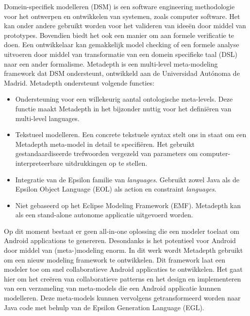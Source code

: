 Domein-specifiek modelleren (DSM) is een software engineering methodologie voor het ontwerpen en ontwikkelen van systemen, zoals computer software. Het kan onder andere gebruikt worden voor het valideren van idee\"en door middel van prototypes. Bovendien biedt het ook een manier om aan formele verificatie te doen. Een ontwikkelaar kan gemakkelijk model checking of een formele analyse uitvoeren door middel van transformatie van een domein specifieke taal (DSL) naar een ander formalisme. Metadepth is een multi-level meta-modeling framework dat DSM ondersteunt, ontwikkeld aan de Universidad Aut\'onoma de Madrid. Metadepth ondersteunt volgende functies:
\begin{itemize}
\item{Ondersteuning voor een willekeurig aantal ontologische meta-levels. Deze functie maakt Metadepth in het bijzonder nuttig voor het defini\"eren van multi-level languages.}
\item{Tekstueel modelleren. Een concrete tekstuele syntax stelt ons in staat om een Metadepth meta-model in detail te specifi\"eren. Het gebruikt gestandaardiseerde trefwoorden vergezeld van parameters om computer-interpreteerbare uitdrukkingen op te stellen.}
\item{Integratie van de Epsilon familie van \textit{languages}. Gebruikt zowel Java als de Epsilon Object Language (EOL) als action en constraint \textit{languages}.}
\item{Niet gebaseerd op het Eclipse Modeling Framework (EMF). Metadepth kan als een stand-alone autonome applicatie uitgevoerd worden.}
\end{itemize}
Op dit moment bestaat er geen all-in-one oplossing die een modeler toelaat om Android applications te genereren. Desondanks is het potentieel voor Android door middel van (meta-)modeling enorm. In dit werk wordt Metadepth gebruikt om een nieuw modeling framework te ontwikkelen. Dit framework laat een modeler toe om snel collaboratieve Android applicaties te ontwikkelen. Het gaat hier om het cre\"eren van collaboratieve patterns en het design en implementeren van een verzameling van meta-models die een Android applicatie kunnen modelleren. Deze meta-models kunnen vervolgens getransformeerd worden naar Java code met behulp van de Epsilon Generation Language (EGL).

